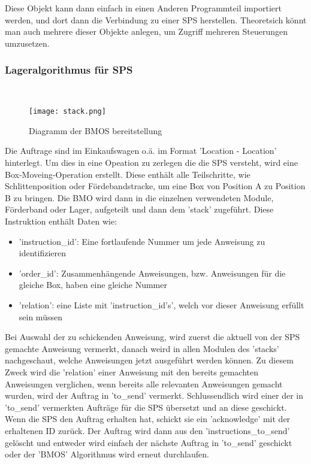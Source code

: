 Diese Objekt kann dann einfach in einen Anderen Programmteil importiert werden, und dort dann die Verbindung zu einer SPS herstellen. Theoretsich könnt man auch mehrere dieser Objekte anlegen, um Zugriff mehreren Steuerungen umzusetzen.

\subsubsection{Lageralgorithmus für SPS}\mbox{}\\

\begin{figure}[h]
    \centering
    \texttt{[image: stack.png]}
    \caption{Diagramm der BMOS bereitstellung}
\end{figure}

Die Auftrage sind im Einkaufswagen o.ä. im Format 'Location -\> Location' hinterlegt. Um dies in eine Opeation zu zerlegen die die SPS versteht, wird eine Box-Moveing-Operation erstellt. Diese enthält alle Teilschritte, wie Schlittenposition oder Fördebandstracke, um eine Box von Position A zu Position B zu bringen. 
Die BMO wird dann in die einzelnen verwendeten Module, Förderband oder Lager, aufgeteilt und dann dem 'stack' zugeführt. Diese Instruktion enthält Daten wie:
\begin{itemize}
    \item 'instruction\_id': Eine fortlaufende Nummer um jede Anweisung zu identifizieren
    \item 'order\_id': Zusammenhängende Anweisungen, bzw. Anweisungen für die gleiche Box, haben eine gleiche Nummer
    \item 'relation': eine Liste mit 'instruction\_id's', welch vor dieser Anweisung erfüllt sein müssen
\end{itemize} 

Bei Auswahl der zu schickenden Anweisung, wird zuerst die aktuell von der SPS gemachte Anweisung vermerkt, danach weird in allen Modulen des 'stacks' nachgeschaut, welche Anweisungen jetzt ausgeführt werden können. Zu diesem Zweck wird die 'relation' einer Anweisung mit den bereits gemachten Anweisungen verglichen, wenn bereits alle relevanten Anweisungen gemacht wurden, wird der Auftrag in 'to\_send' vermerkt. Schlussendlich wird einer der in 'to\_send' vermerkten Aufträge für die SPS übersetzt und an diese geschickt. 
Wenn die SPS den Auftrag erhalten hat, schickt sie ein 'acknowledge' mit der erhaltenen ID zurück. Der Auftrag wird dann aus den 'instructions\_to\_send' gelöscht und entweder wird einfach der nächste Auftrag in 'to\_send' geschickt oder der 'BMOS' Algorithmus wird erneut durchlaufen.


